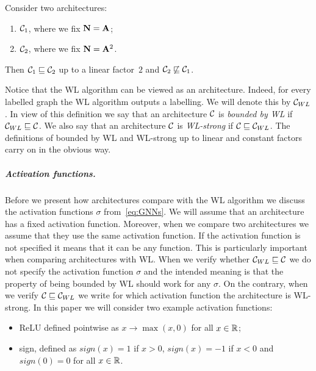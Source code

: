 \begin{example}
Consider two architectures:
\begin{enumerate}
 \item $\mathcal{C}_1$, where we fix $\mathbf{N} = \mathbf{A}$;
 \item $\mathcal{C}_2$, where we fix $\mathbf{N} = \mathbf{A}^2$.
\end{enumerate}
Then $\mathcal{C}_1 \sqsubseteq \mathcal{C}_2$ up to a linear factor~$2$ and $\mathcal{C}_2 \not \sqsubseteq \mathcal{C}_1$.
\end{example}

Notice that the WL algorithm can be viewed as an architecture. Indeed, for every labelled graph the WL algorithm outputs a labelling. We will denote this by $\mathcal{C}_{WL}$. In view of this definition we say that an architecture $\mathcal{C}$ is \emph{bounded by WL} if $\mathcal{C}_{WL} \sqsubseteq \mathcal{C}$. We also say that an architecture $\mathcal{C}$ is \emph{WL-strong} if $\mathcal{C} \sqsubseteq \mathcal{C}_{WL}$. The definitions of bounded by WL and WL-strong up to linear and constant factors carry on in the obvious way.


\subparagraph*{Activation functions.}
Before we present how architectures compare with the WL algorithm we discuss the activation functions $\sigma$ from~\eqref{eq:GNNs}. We will assume that an architecture has a fixed activation function. Moreover, when we compare two architectures we assume that they use the same activation function. If the activation function is not specified it means that it can be any function. This is particularly important when comparing architectures with WL. When we verify whether $\mathcal{C}_{WL} \sqsubseteq \mathcal{C}$ we do not specify the activation function $\sigma$ and the intended meaning is that the property of being bounded by WL should work for any $\sigma$. On the contrary, when we verify $\mathcal{C} \sqsubseteq \mathcal{C}_{WL}$ we write for which activation function the architecture is WL-strong. In this paper we will consider two example activation functions:
\begin{itemize}
 \item ReLU defined pointwise as $x \to \max(x, 0)$ for all $x \in \mathbb{R}$;
 \item sign, defined as $sign(x) = 1$ if $x > 0$, $sign(x) = -1$ if $x < 0$ and $sign(0) = 0$ for all $x \in \mathbb{R}$.
\end{itemize}

